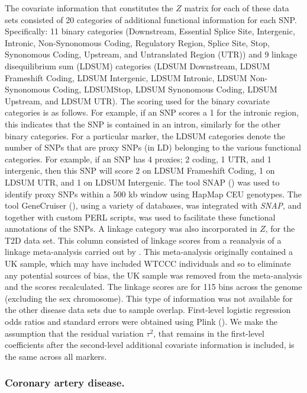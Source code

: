 \documentclass[oupdraft]{bio}
\begin{document}
The covariate information that constitutes the $Z$ matrix
for each of these data sets consisted of 20 categories
of additional functional information for each SNP.
Specifically: 11 binary categories (Downstream, Essential
Splice Site, Intergenic, Intronic, Non-Synonomous Coding,
Regulatory Region, Splice Site, Stop, Synonomous Coding,
Upstream, and Untranslated Region (UTR)) and 9 linkage
disequilibrium sum (LDSUM) categories (LDSUM Downstream,
LDSUM Frameshift Coding, LDSUM Intergenic, LDSUM Intronic,
LDSUM Non-Synonomous Coding, LDSUMStop, LDSUM Synonomous
Coding, LDSUM Upstream, and LDSUM UTR). The scoring used
for the binary covariate categories is as follows. For
example, if an SNP scores a 1 for the intronic region,
this indicates that the SNP is contained in an intron,
similarly for the other binary categories. For a particular
marker, the LDSUM categories denote the number of SNPs
that are proxy SNPs (in LD) belonging to the various
functional categories. For example, if an SNP has 4 proxies;
2 coding, 1 UTR, and 1 intergenic, then this SNP will
score 2 on LDSUM Frameshift Coding, 1 on LDSUM UTR, and
1 on LDSUM Intergenic. The tool SNAP
(\citealp{Fimmers_Seuchter:1989})
was used to identify proxy SNPs within a 500 kb window
using HapMap CEU genotypes. The tool GeneCruiser
(\citealp{Barlow:1972}),
using a variety of databases, was integrated with
\textit{SNAP}, and together with custom PERL scripts, was
used to facilitate these functional annotations of the
SNPs. A linkage category was also incorporated in $Z$,
for the T2D data set. This column consisted of linkage
scores from a reanalysis of a linkage meta-analysis
carried out by
\citet{Castelloe_Zimmerman:2002}.
This meta-analysis originally contained a UK sample,
which may have included WTCCC individuals and so to
eliminate any potential sources of bias, the UK sample
was removed from the meta-analysis and the scores
recalculated. The linkage scores are for 115 bins across
the genome (excluding the sex chromosome). This type of
information was not available for the other disease data
sets due to sample overlap. First-level logistic regression
odds ratios and standard errors were obtained using Plink
(\citealp{Schwender:2007}).
We make the assumption that the residual variation $\tau^2$,
that remains in the first-level coefficients after the
second-level additional covariate information is included,
is the same across all markers.


\subsubsection{Coronary artery disease.}
\end{document}
